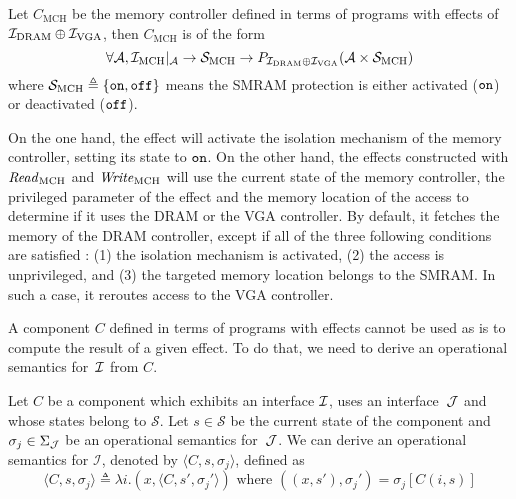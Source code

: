 \begin{example}
  \label{ex:mch-specs}

  Let $C_{\mathrm{MCH}}$ be the memory controller defined in terms of programs
  with effects of $\mathcal{I}_{\mathrm{DRAM}} \oplus \mathcal{I}_{\mathrm{VGA}}$, then
  $C_{\mathrm{MCH}}$ is of the form
  \[
    \forall \mathcal{A}, \mathcal{I}_{\mathrm{MCH}}|_{\mathcal{A}} \rightarrow
    \mathcal{S}_{\mathrm{MCH}} \rightarrow P_{\mathcal{I}_{\mathrm{DRAM}} \oplus
      \mathcal{I}_{\mathrm{VGA}}}(\mathcal{A} \times \mathcal{S}_{\mathrm{MCH}})
  \] where $\mathcal{S}_{\mathrm{MCH}} \triangleq \{ \mathtt{on}, \mathtt{off} \}$
  means the SMRAM protection is either activated ($\mathtt{on}$) or deactivated
  ($\mathtt{off}$).

  On the one hand, the  effect will activate the isolation mechanism
  of the memory controller, setting its state to $\mathtt{on}$.
  On the other hand, the effects constructed with $\mathit{Read}_{\mathrm{MCH}}$
  and $\mathit{Write}_{\mathrm{MCH}}$ will use the current state of the memory
  controller, the privileged parameter of the effect and the memory location of
  the access to determine if it uses the DRAM or the VGA controller.
  By default, it fetches the memory of the DRAM controller, except if all of the
  three following conditions are satisfied : (1) the isolation mechanism is
  activated, (2) the access is unprivileged, and (3) the targeted memory
  location belongs to the SMRAM.
  In such a case, it reroutes access to the VGA controller.
\end{example}

A component $C$ defined in terms of programs with effects cannot be used as is
to compute the result of a given effect.
%
To do that, we need to derive an operational semantics for~$\mathcal{I}$ from $C$.

\begin{definition}
  \label{def:freespec:derivation}

  Let $C$ be a component which exhibits an interface $\mathcal{I}$, uses an
  interface~$\mathcal{J}$ and whose states belong to $\mathcal{S}$.
  Let $s \in \mathcal{S}$ be the current state of the component and
  $\sigma_j \in \Sigma_{\mathcal{J}}$ be an operational semantics for~$\mathcal{J}$.
  We can derive an operational semantics for $\mathcal{I}$, denoted by
  $\langle C, s, \sigma_j \rangle$, defined as
  \[ \langle C, s, \sigma_j \rangle \triangleq \lambda i. (x, \langle C, s',
    \sigma_j' \rangle) \text{ where } ((x, s'), \sigma_j') = \sigma_j[C (i, s)]
  \]
\end{definition}

